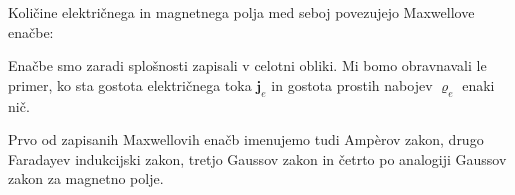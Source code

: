 Količine električnega in magnetnega polja med seboj povezujejo Maxwellove
enačbe:

Enačbe smo zaradi splošnosti zapisali v celotni obliki. Mi bomo 
obravnavali le primer, ko sta gostota električnega toka $\mathbf{j}_e$ in 
gostota prostih nabojev $\varrho_e$ enaki nič.

\begin{remark}
Prvo od zapisanih Maxwellovih enačb imenujemo tudi Amp\`{e}rov zakon,
drugo Faradayev indukcijski zakon,
tretjo Gaussov zakon in četrto po analogiji Gaussov zakon za magnetno polje.
\end{remark}

